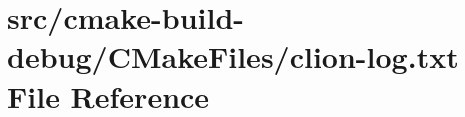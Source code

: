 \hypertarget{cmake-build-debug_2CMakeFiles_2clion-log_8txt}{}\section{src/cmake-\/build-\/debug/\+C\+Make\+Files/clion-\/log.txt File Reference}
\label{cmake-build-debug_2CMakeFiles_2clion-log_8txt}

